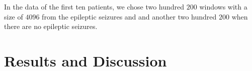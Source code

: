 In the data of the first ten patients, we chose two hundred $200$ windows with a size of $4096$ from the epileptic seizures and and another two hundred $200$ when there are no epileptic seizures.

\section{Results and Discussion}
\label{sec:resu}

